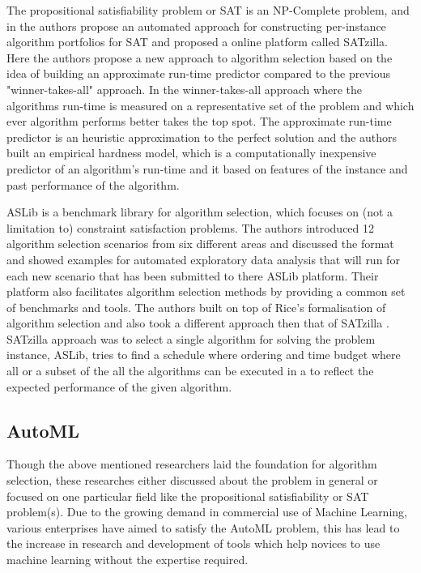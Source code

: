 The propositional satisfiability problem or SAT is an NP-Complete problem, and in \citep{xu-et-al} the authors propose an automated approach for constructing per-instance algorithm portfolios for SAT and proposed a online platform called SATzilla. Here the authors propose a new approach to algorithm selection based on the idea of building an approximate run-time predictor compared to the previous "winner-takes-all" approach. In the winner-takes-all approach where the algorithms run-time is measured on a representative set of the problem and which ever algorithm performs better takes the top spot. The approximate run-time predictor is an heuristic approximation to the perfect solution and the authors built an empirical hardness model, which is a computationally inexpensive predictor of an algorithm’s run-time and it based on features of the instance and past performance of the algorithm.

ASLib \citep{bischl-et-al} is a benchmark library for algorithm selection, which focuses on (not a limitation to) constraint satisfaction problems. The authors introduced 12 algorithm selection scenarios from six diﬀerent areas and discussed the format and showed examples for automated exploratory data analysis that will run for each new scenario that has been submitted to there ASLib platform. Their platform also facilitates algorithm selection methods by providing a common set of benchmarks and tools. The authors built on top of Rice's \citep{rice197665} formalisation of algorithm selection and also took a different approach then that of SATzilla \citep{xu-et-al}. SATzilla approach was to select a single algorithm for solving the problem instance, ASLib, tries to find a schedule where ordering and time budget where all or a subset of the all the algorithms can be executed in a to reflect the expected performance of the given algorithm.

\subsection*{AutoML}

Though the above mentioned researchers laid the foundation for algorithm selection, these researches either discussed about the problem in general or focused on one particular field like the propositional satisfiability or SAT problem(s). Due to the growing demand in commercial use of Machine Learning, various enterprises have aimed to satisfy the AutoML problem, this has lead to the increase in research and development of tools which help novices to use machine learning without the expertise required.

